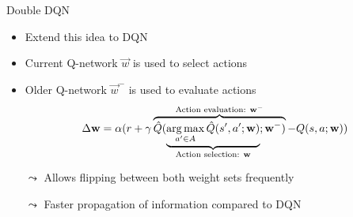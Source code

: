 \begin{frame}[c]{Double DQN}
	
	\begin{itemize}
		\item Extend this idea to DQN
		\item Current Q-network $\vec{w}$ is used to select actions 
		\item Older Q-network $\vec{w}^-$ is used to evaluate actions
		$$\Delta \mathbf{w} = \alpha (r + \gamma \overbrace{\hat{Q}(\underbrace{\operatorname*{arg\,max}_{a' \in A} \hat{Q}(s',a';\mathbf{w})}_{\text{Action selection: }\mathbf{w}};\mathbf{w}^-)}^{\text{Action evaluation: }\mathbf{w}^-} - Q(s,a;\mathbf{w}))$$
		
		\bigskip
		\pause
		\item[$\leadsto$] Allows flipping between both weight sets frequently
		\item[$\leadsto$] Faster propagation of information compared to DQN
	\end{itemize}
	
\end{frame}

